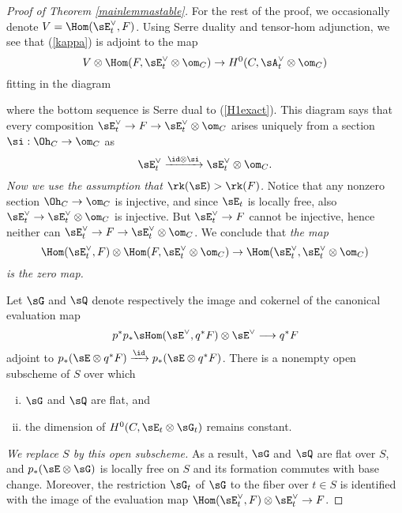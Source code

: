 \begin{proof}[Proof of Theorem \ref{mainlemmastable}]
For the rest of the proof, we occasionally denote $V = \Hom(\sE_t^\vee, F)$. Using Serre duality and tensor-hom adjunction, we see that (\ref{kappa}) is adjoint to the map
\[ V \otimes \Hom(F, \sE_t^\vee \otimes \om_C) \to H^0(C, \sA_t^\vee \otimes \om_C) \]
fitting in the diagram
\begin{center}
\end{center}
where the bottom sequence is Serre dual to (\ref{H1exact}). This diagram says that every composition $\sE_t^\vee \to F \to \sE_t^\vee \otimes \om_C$ arises uniquely from a section $\si: \Oh_C \to \om_C$ as 
\[ \sE_t^\vee \xrightarrow{\id \otimes \si} \sE_t^\vee \otimes \om_C. \] 
\emph{Now we use the assumption that $\rk(\sE) > \rk(F)$.} Notice that any nonzero section $\Oh_C \to \om_C$ is injective, and since $\sE_t$ is locally free, also $\sE_t^\vee \to \sE_t^\vee \otimes \om_C$ is injective. But $\sE_t^\vee \to F$ cannot be injective, hence neither can $\sE_t^\vee \to F \to \sE_t^\vee \otimes \om_C$. We conclude that \emph{the map}
\[ \Hom(\sE_t^\vee, F) \otimes \Hom(F, \sE_t^\vee \otimes \om_C) \to \Hom(\sE_t^\vee, \sE_t^\vee \otimes \om_C) \]
\emph{is the zero map.}

Let $\sG$ and $\sQ$ denote respectively the image and cokernel of the canonical evaluation map
\[ p^*p_*\sHom(\sE^\vee, q^*F) \otimes \sE^\vee \longrightarrow q^*F \]
adjoint to $p_*(\sE \otimes q^*F) \xrightarrow{\id} p_*(\sE \otimes q^*F)$. There is a nonempty open subscheme of $S$ over which 
\begin{enumerate}[(i)]
    \item $\sG$ and $\sQ$ are flat, and
    \item the dimension of $H^0(C, \sE_t \otimes \sG_t)$ remains constant.
\end{enumerate} 
\emph{We replace $S$ by this open subscheme.} As a result, $\sG$ and $\sQ$ are flat over $S$, and $p_*(\sE \otimes \sG)$ is locally free on $S$ and its formation commutes with base change. Moreover, the restriction $\sG_t$ of $\sG$ to the fiber over $t \in S$ is identified with the image of the evaluation map $\Hom(\sE_t^\vee, F) \otimes \sE_t^\vee \to F$. 


\end{proof}
